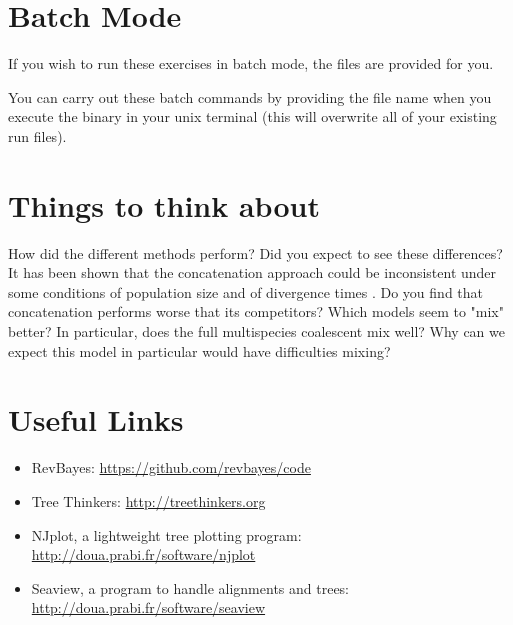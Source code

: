 \bigskip


\section{Batch Mode}

If you wish to run these exercises in batch mode, the files are provided for you. 

You can carry out these batch commands by providing the file name when you execute the  binary in your unix terminal (this will overwrite all of your existing run files).


\section{Things to think about}
How did the different methods perform? 
Did you expect to see these differences?
It has been shown that the concatenation approach could be inconsistent under some conditions of population size and of divergence times \citep{Degnan2006}. 
Do you find that concatenation performs worse that its competitors?
Which models seem to "mix" better?
In particular, does the full multispecies coalescent mix well?
Why can we expect this model in particular would have difficulties mixing?


\bigskip
\section{Useful Links}

\begin{itemize}
\item RevBayes: \href{https://github.com/revbayes/code}{https://github.com/revbayes/code} \\ \vspace{-7mm}
\item Tree Thinkers: \href{http://treethinkers.org/}{http://treethinkers.org} \\ \vspace{-7mm}
\item NJplot, a lightweight tree plotting program: \href{http://doua.prabi.fr/software/njplot}{http://doua.prabi.fr/software/njplot} \\ \vspace{-7mm}
\item Seaview, a program to handle alignments and trees: \href{http://doua.prabi.fr/software/seaview}{http://doua.prabi.fr/software/seaview} \\ \vspace{-7mm}

\end{itemize}

